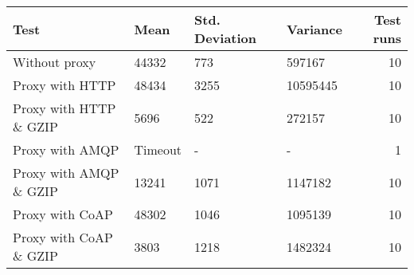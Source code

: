 \begin{tabular}{llllr}
\hline
 Test                   & Mean    & Std. Deviation   & Variance   &   Test runs \\
\hline
 Without proxy          & 44332   & 773              & 597167     &          10 \\
 Proxy with HTTP        & 48434   & 3255             & 10595445   &          10 \\
 Proxy with HTTP \& GZIP & 5696    & 522              & 272157     &          10 \\
 Proxy with AMQP        & Timeout & -                & -          &           1 \\
 Proxy with AMQP \& GZIP & 13241   & 1071             & 1147182    &          10 \\
 Proxy with CoAP        & 48302   & 1046             & 1095139    &          10 \\
 Proxy with CoAP \& GZIP & 3803    & 1218             & 1482324    &          10 \\
\hline
\end{tabular}